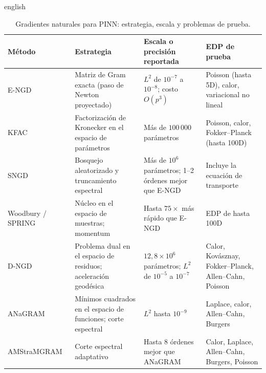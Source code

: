 \documentclass[0000.tex]{subfiles}
\begin{document}
\begin{hyphenrules}{english}
\begin{table}[htbp]
\centering\small
\caption{Gradientes naturales para PINN: estrategia, escala y problemas de prueba.}
\label{tab:ea-ngd}
\begin{tabularx}{\textwidth}{@{}l Y Y Y@{}}
\toprule
Método & Estrategia & Escala o precisión reportada & EDP de prueba \\
\midrule
E-NGD~\cite{muller2023achieving} & Matriz de Gram exacta (paso de Newton proyectado) & $L^2$ de $10^{-7}$ a $10^{-8}$; costo $O(p^3)$ & Poisson (hasta 5D), calor, variacional no lineal \\
KFAC~\cite{dangel2024kronecker} & Factorización de Kronecker en el espacio de parámetros & Más de $100\,000$ parámetros & Poisson, calor, Fokker--Planck (hasta 100D) \\
SNGD~\cite{mckay2025near} & Bosquejo aleatorizado y truncamiento espectral & Más de $10^6$ parámetros; 1--2 órdenes mejor que E-NGD & Incluye la ecuación de transporte \\
Woodbury / SPRING~\cite{guzman2025improving} & Núcleo en el espacio de muestras; momentum & Hasta $75\times$ más rápido que E-NGD & EDP de hasta 100D \\
D-NGD~\cite{jnini2025dual} & Problema dual en el espacio de residuos; aceleración geodésica & $12{,}8\times10^6$ parámetros; $L^2$ de $10^{-5}$ a $10^{-7}$ & Calor, Kovásznay, Fokker--Planck, Allen--Cahn, Poisson \\
ANaGRAM~\cite{schwencke2024anagram} & Mínimos cuadrados en el espacio de funciones; corte espectral & $L^2$ hasta $10^{-9}$ & Laplace, calor, Allen--Cahn, Burgers \\
AMStraMGRAM~\cite{schwencke2025amstramgram} & Corte espectral adaptativo & Hasta 8 órdenes mejor que ANaGRAM & Calor, Laplace, Allen--Cahn, Burgers, Poisson \\
\bottomrule
\end{tabularx}
\end{table}


\end{hyphenrules}
\end{document}
